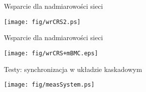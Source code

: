 \documentclass[compress,red]{beamer}
\begin{document}
\begin{frame}{Wsparcie dla nadmiarowości sieci}


  \begin{center}
  \texttt{[image: fig/wrCRS2.ps]}
  \end{center}

\end{frame}
\begin{frame}{Wsparcie dla nadmiarowości sieci}


  \begin{center}
  \texttt{[image: fig/wrCRS+mBMC.eps]}
  \end{center}

\end{frame}
\begin{frame}{Testy: synchronizacja w układzie kaskadowym}

    \begin{center}
    \texttt{[image: fig/measSystem.ps]}
    \end{center}

\end{frame}
\end{document}
